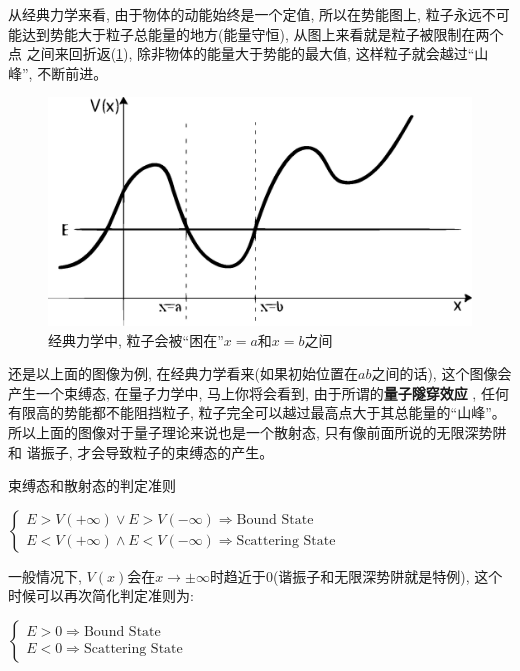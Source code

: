 \documentclass[a4paper,zihao=-4,linespread=1]{ctexrep}
\begin{document}
    从经典力学来看, 由于物体的动能始终是一个定值, 所以在势能图上, 粒子永远不可能达到势能大于粒子总能量的地方(能量守恒), 从图上来看就是粒子被限制在两个点
    之间来回折返(\ref{turning_point}), 除非物体的能量大于势能的最大值, 这样粒子就会越过“山峰”, 不断前进。
    \begin{figure}[htbp]
        \centering
        \label{turning_point}
        \includegraphics[scale=0.5]{fig/2-5-1.eps}
        \caption{经典力学中, 粒子会被“困在”$x=a$和$x=b$之间}
    \end{figure}
    还是以上面的图像为例, 在经典力学看来(如果初始位置在$ab$之间的话), 这个图像会产生一个束缚态, 在量子力学中, 马上你将会看到, 由于所谓的\textbf{量子隧穿效应}
    , 任何有限高的势能都不能阻挡粒子, 粒子完全可以越过最高点大于其总能量的“山峰”。所以上面的图像对于量子理论来说也是一个散射态, 只有像前面所说的无限深势阱和
    谐振子, 才会导致粒子的束缚态的产生。
    \begin{theorem}{束缚态和散射态的判定准则}
        \begin{center}
            \begin{math}
                \displaystyle
                \begin{cases}
                    E>V(+\infty) \vee E>V(-\infty) \Rightarrow \text{Bound State}\\
                    E<V(+\infty) \wedge E<V(-\infty) \Rightarrow \text{Scattering State}
                \end{cases}
            \end{math}
        \end{center}
        一般情况下, $V(x)$会在$x\to\pm\infty$时趋近于$0$(谐振子和无限深势阱就是特例), 这个时候可以再次简化判定准则为:
        \begin{center}
            \begin{math}
                \displaystyle
                \begin{cases}
                    E>0 \Rightarrow \text{Bound State}\\
                    E<0 \Rightarrow \text{Scattering State}
                \end{cases}
            \end{math}
        \end{center}
    \end{theorem}
\end{document}
